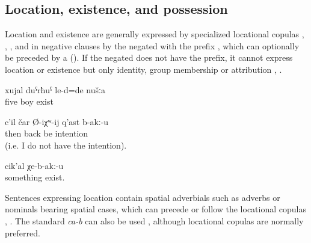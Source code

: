 
\subsection{Location, existence, and possession}
\label{ssec:Location, existence, and possession}

Location and existence are generally expressed by specialized locational copulas , , , and in negative clauses by the negated  with the  prefix , which can optionally be preceded by a   (). If the negated  does not have the  prefix, it cannot express location or existence but only identity, group membership or attribution , . 
%
\begin{exe}
	\ex	\label{ex:We were five guys}
	\gll	xujal	duˁrħuˁ	le-d=de	nušːa\\
		five	boy	exist	\\
	\glt	{}
	

	\ex	\label{ex:There is no intention to go back}
	\gll	c'il	čar	Ø-iχʷ-ij	q'ast	b-akː-u\\
		then	back	be	intention	\\
	\glt	{} (i.e. I do not have the intention).

	\ex	\label{ex:There is nothing more}
	\gll	cik'al	χe-b-akː-u\\
		something	exist.\\
	\glt	{}

\end{exe}

Sentences expressing location contain spatial adverbials such as adverbs or nominals bearing spatial cases, which can precede or follow the locational copulas , . The standard  \textit{ca-b} can also be used , although locational copulas are normally preferred. 

